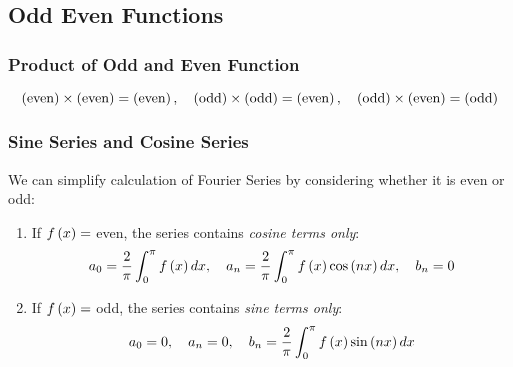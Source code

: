 \subsection{Odd Even Functions}
\begin{center}
\end{center}
\subsubsection{Product of Odd and Even Function}
\begin{equation}
    \left(\text{even}\right)\times\left(\text{even}\right)=\left(\text{even}\right),\quad\left(\text{odd}\right)\times\left(\text{odd}\right)=\left(\text{even}\right),\quad\left(\text{odd}\right)\times\left(\text{even}\right)=\left(\text{odd}\right)
\end{equation}
\subsubsection{Sine Series and Cosine Series}
We can simplify calculation of Fourier Series by considering whether it is even or odd:
\begin{enumerate}
    \item If $f\left(x\right)=$ even, the series contains \textit{cosine terms only}:
    \begin{equation}
        a_0=\frac{2}{\pi}\int_{0}^{\pi}f\left(x\right)dx,\quad a_n=\frac{2}{\pi}\int_{0}^{\pi}f\left(x\right)\cos\left(nx\right)dx,\quad b_n=0
    \end{equation}
    \item If $f\left(x\right)=$ odd, the series contains \textit{sine terms only}:
    \begin{equation}
        a_0=0,\quad a_n=0,\quad b_n=\frac{2}{\pi}\int_{0}^{\pi}f\left(x\right)\sin\left(nx\right)dx
    \end{equation}
\end{enumerate}
